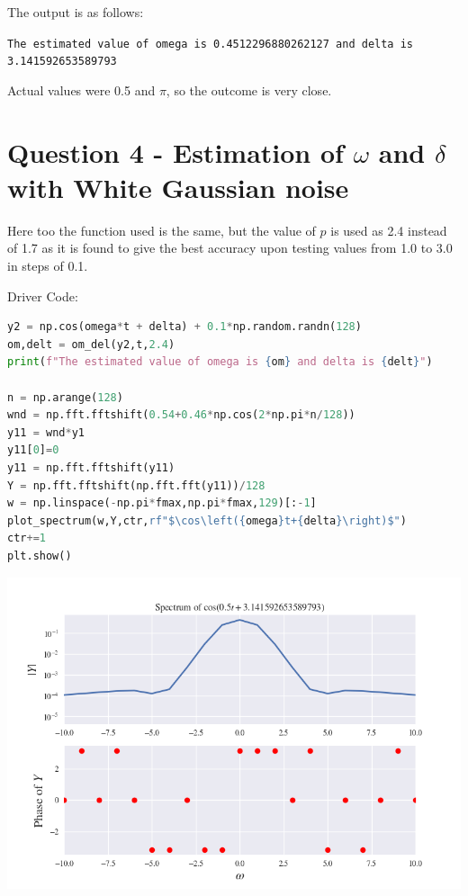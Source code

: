 \documentclass[12pt]{article}
\begin{document}
The output is as follows:

\texttt{The estimated value of omega is 0.4512296880262127 and delta is 3.141592653589793}

Actual values were 0.5 and $\pi$, so the outcome is very close.

\pagebreak

\section{Question 4 - Estimation of $\omega$ and $\delta$ with White Gaussian noise}

Here too the function used is the same, but the value of $p$ is used as 2.4 instead of 1.7 as it is found to give the best accuracy upon testing values from 1.0 to 3.0 in steps of 0.1.

Driver Code:
\begin{lstlisting}[language=Python]
y2 = np.cos(omega*t + delta) + 0.1*np.random.randn(128)
om,delt = om_del(y2,t,2.4)
print(f"The estimated value of omega is {om} and delta is {delt}")

n = np.arange(128)
wnd = np.fft.fftshift(0.54+0.46*np.cos(2*np.pi*n/128))
y11 = wnd*y1
y11[0]=0
y11 = np.fft.fftshift(y11)
Y = np.fft.fftshift(np.fft.fft(y11))/128
w = np.linspace(-np.pi*fmax,np.pi*fmax,129)[:-1]
plot_spectrum(w,Y,ctr,rf"$\cos\left({omega}t+{delta}\right)$")
ctr+=1
plt.show()
\end{lstlisting}

\begin{center}
    \includegraphics[scale=0.8]{images/fig11.png}
\end{center}
\end{document}
